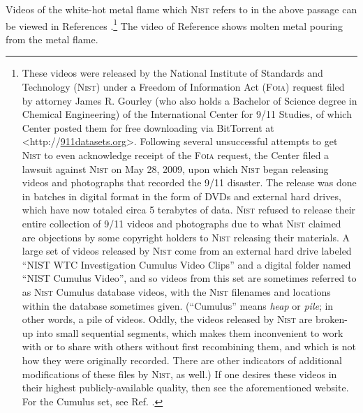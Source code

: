 \documentclass[letterpaper,12pt]{article}
\newcommand{\dsc}{\discretionary{}{}{}}
\begin{document}
Videos of the white-hot metal flame which \textsc{Nist} refers to in the above passage can be viewed in References .\footnote{These videos were released by the National Institute of Standards and Technology (\textsc{Nist}) under a Freedom of Information Act (\textsc{Foia}) request filed by attorney James R. Gourley (who also holds a Bachelor of Science degree in Chemical Engineering) of the International Center for 9/11 Studies, of which Center posted them for free downloading via BitTorrent at \textless http://\dsc \href{http://911datasets.org}{911datasets.org}\textgreater . Following several unsuccessful attempts to get \textsc{Nist} to even acknowledge receipt of the \textsc{Foia} request, the Center filed a lawsuit against \textsc{Nist} on May 28, 2009, upon which \textsc{Nist} began releasing videos and photographs that recorded the 9/11 disaster. The release was done in batches in digital format in the form of DVDs and external hard drives, which have now totaled circa 5 terabytes of data. \textsc{Nist} refused to release their entire collection of 9/11 videos and photographs due to what \textsc{Nist} claimed are objections by some copyright holders to \textsc{Nist} releasing their materials. A large set of videos released by \textsc{Nist} come from an external hard drive labeled ``NIST WTC Investigation Cumulus Video Clips'' and a digital folder named ``NIST Cumulus Video'', and so videos from this set are sometimes referred to as \textsc{Nist} Cumulus database videos, with the \textsc{Nist} filenames and locations within the database sometimes given. (``Cumulus'' means \emph{heap} or \emph{pile}; in other words, a pile of videos. Oddly, the videos released by \textsc{Nist} are broken-up into small sequential segments, which makes them inconvenient to work with or to share with others without first recombining them, and which is not how they were originally recorded. There are other indicators of additional modifications of these files by \textsc{Nist}, as well.) If one desires these videos in their highest publicly-available quality, then see the aforementioned website. For the Cumulus set, see Ref. .} The video of Reference  shows molten metal pouring from the metal flame.
\end{document}
